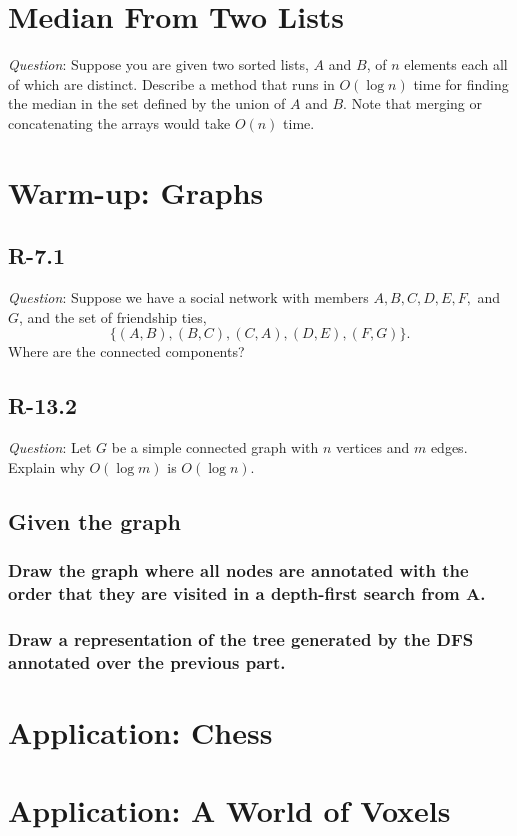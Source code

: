 \documentclass[11pt]{article}
\begin{document}
\section{Median From Two Lists}
\noindent \emph{Question}: Suppose you are given two sorted lists, $A$ and $B$, of $n$ elements each all of which are distinct. Describe a method that runs in $O(\log n)$ time for finding the median in the set defined by the union of $A$ and $B$. Note that merging or concatenating the arrays would take $O(n)$ time.
\section{Warm-up: Graphs}
\subsection{R-7.1}
\noindent \emph{Question}: Suppose we have a social network with members $A,B,C,D,E,F,$ and $G$, and the set of friendship ties,
\begin{equation*}
	\{(A,B),(B,C),(C,A),(D,E),(F,G)\}.
\end{equation*}
Where are the connected components?

\subsection{R-13.2}
\noindent \emph{Question}: Let $G$ be a simple connected graph with $n$ vertices and $m$ edges. Explain why $O(\log m)$ is $O(\log n)$.

\subsection{Given the graph}
\subsubsection{Draw the graph where all nodes are annotated with the order that they are visited in a \textbf{depth-first} search from A.}
\subsubsection{Draw a representation of the tree generated by the DFS annotated over the previous part.}
\section{Application: Chess}
\section{Application: A World of Voxels}
\end{document}
